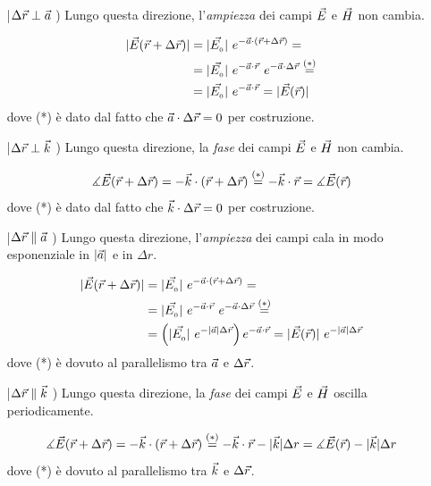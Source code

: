 	\begin{itemize}
		\item[|$\Delta\vec{r} \perp \vec{a}$ )] Lungo questa direzione, l'\emph{ampiezza} dei campi $\vec{E}$ e $\vec{H}$ non cambia.

		\begin{equation*}
			\begin{split}
				|\vec{E}(\vec{r} + \Delta\vec{r})| &= |\vec{E_{_{0}}}| ~ e^{-\vec{a} \cdot (\vec{r} + \Delta\vec{r})} = \\
				& = |\vec{E_{_{0}}}| ~ e^{-\vec{a} \cdot \vec{r}} ~ e^{-\vec{a} \cdot \Delta\vec{r}} \stackrel{(*)}{=} \\
				& = |\vec{E_{_{0}}}| ~ e^{-\vec{a} \cdot \vec{r}} = |\vec{E}(\vec{r})|
			\end{split}
		\end{equation*}
		dove (*) è dato dal fatto che $\vec{a} \cdot \Delta\vec{r} = 0$ per costruzione.

		\item[|$\Delta\vec{r} \perp \vec{k}$ )] Lungo questa direzione, la \emph{fase} dei campi $\vec{E}$ e $\vec{H}$ non cambia.

		\begin{equation*}
				\measuredangle \vec{E}(\vec{r} + \Delta\vec{r}) = -\vec{k} \cdot (\vec{r} + \Delta\vec{r}) \stackrel{(*)}{=} - \vec{k} \cdot \vec{r} = \measuredangle \vec{E}(\vec{r})
		\end{equation*}
		dove (*) è dato dal fatto che $\vec{k} \cdot \Delta\vec{r} = 0$ per costruzione.

		\item[|$\Delta\vec{r} \parallel \vec{a}$ )] Lungo questa direzione, l'\emph{ampiezza} dei campi cala in modo esponenziale in $|\vec{a}|$ e in $\Delta r$.

		\begin{equation*}
			\begin{split}
				|\vec{E}(\vec{r} + \Delta\vec{r})| &= |\vec{E_{_{0}}}| ~ e^{-\vec{a} \cdot (\vec{r} + \Delta\vec{r})} = \\
				& = |\vec{E_{_{0}}}| ~ e^{-\vec{a} \cdot \vec{r}} ~ e^{-\vec{a} \cdot \Delta\vec{r}} \stackrel{(*)}{=} \\
				& = \left( |\vec{E_{_{0}}}| ~ e^{-|\vec{a}| \Delta\vec{r}} \right) e^{-\vec{a} \cdot \vec{r}} = |\vec{E}(\vec{r})| ~ e^{-|\vec{a}| \Delta\vec{r}}
			\end{split}
		\end{equation*}
		dove (*) è dovuto al parallelismo tra $\vec{a}$ e $\Delta\vec{r}$.

		\item[|$\Delta\vec{r} \parallel \vec{k}$ )] Lungo questa direzione, la \emph{fase} dei campi $\vec{E}$ e $\vec{H}$ oscilla periodicamente.

		\begin{equation*}
				\measuredangle \vec{E}(\vec{r} + \Delta\vec{r}) = -\vec{k} \cdot (\vec{r} + \Delta\vec{r}) \stackrel{(*)}{=} - \vec{k} \cdot \vec{r} - |\vec{k}| \Delta r = \measuredangle \vec{E}(\vec{r}) - |\vec{k}| \Delta r
		\end{equation*}
		dove (*) è dovuto al parallelismo tra $\vec{k}$ e $\Delta\vec{r}$.


\end{itemize}
